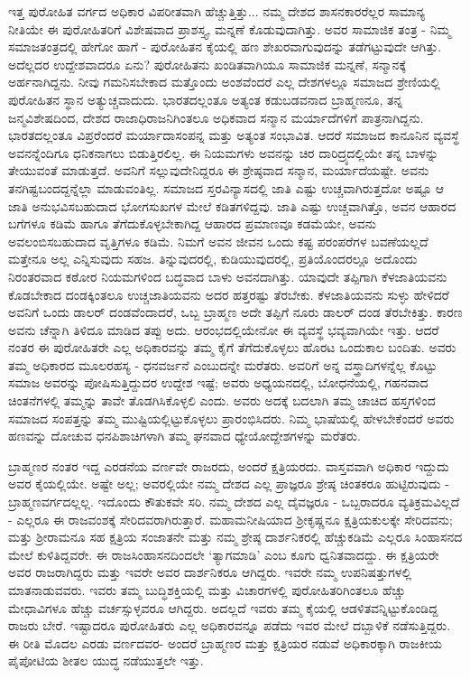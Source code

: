 ಇತ್ತ ಪುರೋಹಿತ ವರ್ಗದ ಅಧಿಕಾರ ವಿಪರೀತವಾಗಿ ಹೆಚ್ಚುತ್ತಿತ್ತು... ನಮ್ಮ ದೇಶದ ಶಾಸನಕಾರರೆಲ್ಲರ ಸಾಮಾನ್ಯ ನೀತಿಯೇ ಈ ಪುರೋಹಿತರಿಗೆ ವಿಶೇಷವಾದ ಪ್ರಾಶಸ್ತ್ಯ, ಮನ್ನಣೆ ಕೊಡುವುದಾಗಿತ್ತು. ಅವರ ಸಾಮಾಜಿಕ ತಂತ್ರ - ನಿಮ್ಮ ಸಮಾಜತಂತ್ರದಲ್ಲಿ ಹೇಗೋ ಹಾಗೆ - ಪುರೋಹಿತನ ಕೈಯಲ್ಲಿ ಹಣ ಶೇಖರವಾಗುವುದನ್ನು ತಡೆಗಟ್ಟುವುದೇ ಆಗಿತ್ತು. ಅದೆಲ್ಲದರ ಉದ್ದೇಶವಾದರೂ ಏನು? ಪುರೋಹಿತನು ಖಂಡಿತವಾಗಿಯೂ ಸಾಮಾಜಿಕ ಮನ್ನಣೆ, ಸನ್ಮಾನಕ್ಕೆ ಅರ್ಹನಾಗಿದ್ದನು. ನೀವು ಗಮನಿಸಬೇಕಾದ ಮತ್ತೊಂದು ಅಂಶವೆಂದರೆ ಎಲ್ಲ ದೇಶಗಳಲ್ಲೂ ಸಮಾಜದ ಶ್ರೇಣಿಯಲ್ಲಿ ಪುರೋಹಿತನ ಸ್ಥಾನ ಅತ್ಯುಚ್ಚವಾದುದು. ಭಾರತದಲ್ಲಂತೂ ಅತ್ಯಂತ ಕಡುಬಡವನಾದ ಬ್ರಾಹ್ಮಣನೂ, ತನ್ನ ಜನ್ಮವಿಶೇಷದಿಂದ, ದೇಶದ ರಾಜಾಧಿರಾಜನಿಗಿಂತಲೂ ಅಧಿಕವಾದ ಸನ್ಮಾನ ಮರ್ಯಾದೆಗಳಿಗೆ ಪಾತ್ರನಾಗಿದ್ದನು. ಭಾರತದಲ್ಲಂತೂ ವಿಪ್ರರೆಂದರೆ ಮರ್ಯಾದಾಸಂಪನ್ನ ಮತ್ತು ಅತ್ಯಂತ ಸಂಭಾವಿತ. ಆದರೆ ಸಮಾಜದ ಕಾನೂನಿನ ವ್ಯವಸ್ಥೆ ಅವನನ್ನೆಂದಿಗೂ ಧನಿಕನಾಗಲು ಬಿಡುತ್ತಿರಲಿಲ್ಲ. ಈ ನಿಯಮಗಳು ಅವನನ್ನು ಚಿರ ದಾರಿದ್ರ್ಯದಲ್ಲಿಯೇ ತನ್ನ ಬಾಳನ್ನು ತೇಯುವಂತೆ ಮಾಡುತ್ತದೆ. ಅವನಿಗೆ ಸಲ್ಲುವುದೇನಿದ್ದರೂ ಈ ಶ್ರೇಷ್ಠವಾದ ಸನ್ಮಾನ, ಮರ್ಯಾದೆಯಷ್ಟೇ. ಅವನು ತನಗಿಷ್ಟಬಂದದ್ದನ್ನೆಲ್ಲಾ ಮಾಡುವಂತಿಲ್ಲ. ಸಮಾಜದ ಸ್ತರವಿನ್ಯಾಸದಲ್ಲಿ ಜಾತಿ ಎಷ್ಟು ಉಚ್ಚವಾಗಿರುತ್ತದೋ ಅಷ್ಟೂ ಆ ಜಾತಿ ಅನುಭವಿಸಬಹುದಾದ ಭೋಗಸುಖಗಳ ಮೇಲೆ ಕಡಿತಗಳಿದ್ದವು. ಜಾತಿ ಎಷ್ಟು ಉಚ್ಚವಾಗಿತ್ತೊ, ಅವನ ಆಹಾರದ ಬಗೆಗಳೂ ಕಡಿಮೆ ಹಾಗೂ ತೆಗೆದುಕೊಳ್ಳಬೇಕಾಗಿದ್ದ ಆಹಾರದ ಪ್ರಮಾಣವೂ ಕಡಮೆಯೇ, ಅವನು ಅವಲಂಬಿಸಬಹುದಾದ ವೃತ್ತಿಗಳೂ ಕಡಿಮೆ. ನಿಮಗೆ ಅವನ ಜೀವನ ಒಂದು ಕಷ್ಟ ಪರಂಪರೆಗಳ ಬವಣೆಯಲ್ಲದೆ ಮತ್ತೇನೂ ಅಲ್ಲ ಎನ್ನಿಸುವುದು ಸಹಜ. ತಿನ್ನುವುದರಲ್ಲಿ, ಕುಡಿಯುವುದರಲ್ಲಿ, ಪ್ರತಿಯೊಂದರಲ್ಲೂ ಅದೊಂದು ನಿರಂತರವಾದ ಕಠೋರ ನಿಯಮಗಳಿಂದ ಬದ್ಧವಾದ ಬಾಳು ಅವನದಾಗಿತ್ತು. ಯಾವುದೇ ತಪ್ಪಿಗಾಗಿ ಕೆಳಜಾತಿಯವನು ಕೊಡಬೇಕಾದ ದಂಡಕ್ಕಿಂತಲೂ ಉಚ್ಚಜಾತಿಯವನು ಅದರ ಹತ್ತರಷ್ಟು ತೆರಬೇಕು. ಕೆಳಜಾತಿಯವನು ಸುಳ್ಳು ಹೇಳಿದರೆ ಅವನಿಗೆ ಒಂದು ಡಾಲರ್ ದಂಡವೆಂದಾದರೆ, ಒಬ್ಬ ಬ್ರಾಹ್ಮಣ ಅದೇ ತಪ್ಪಿಗೆ ನೂರು ಡಾಲರ್ ದಂಡ ತೆರಬೇಕಿತ್ತು. ಕಾರಣ ಅವನು ಚೆನ್ನಾಗಿ ತಿಳಿದೂ ಮಾಡಿದ ತಪ್ಪು ಅದು. ಆರಂಭದಲ್ಲಿಯೇನೋ ಈ ವ್ಯವಸ್ಥೆ ಭವ್ಯವಾಗಿಯೇ ಇತ್ತು. ಆದರೆ ನಂತರ ಈ ಪುರೋಹಿತರೇ ಎಲ್ಲ ಅಧಿಕಾರವನ್ನು ತಮ್ಮ ಕೈಗೆ ತೆಗೆದುಕೊಳ್ಳಲು ಹೊರಟ ಒಂದುಕಾಲ ಬಂದಿತು. ಅವರು ತಮ್ಮ ಅಧಿಕಾರದ ಮೂಲರಹಸ್ಯ - ಧನವರ್ಜನೆ ಎಂಬುದನ್ನೇ ಮರೆತರು. ಅವರಿಗೆ ಅನ್ನ ವಸ್ತ್ರಾದಿಗಳನ್ನೆಲ್ಲ ಕೊಟ್ಟು ಸಮಾಜ ಅವರನ್ನು ಪೋಷಿಸುತ್ತಿದ್ದುದರ ಉದ್ದೇಶ ಇಷ್ಟೆ; ಅವರು ಅಧ್ಯಯನದಲ್ಲಿ, ಬೋಧನೆಯಲ್ಲಿ, ಗಹನವಾದ ಚಿಂತನೆಗಳಲ್ಲಿ ತಮ್ಮನ್ನು ತಾವೇ ತೊಡಗಿಸಿಕೊಳ್ಳಲಿ ಎಂದು. ಅವರು ಅದಕ್ಕೆ ಬದಲಾಗಿ ತಮ್ಮ ಚಾಚಿದ ಹಸ್ತಗಳಿಂದ ಸಮಾಜದ ಸಂಪತ್ತನ್ನು ತಮ್ಮ ಮುಷ್ಟಿಯಲ್ಲಿಟ್ಟುಕೊಳ್ಳಲು ಪ್ರಾರಂಭಿಸಿದರು. ನಿಮ್ಮ ಭಾಷೆಯಲ್ಲಿ ಹೇಳಬೇಕೆಂದರೆ ಅವರು ಹಣವನ್ನು ದೋಚುವ ಧನಪಿಶಾಚಿಗಳಾಗಿ ತಮ್ಮ ಘನವಾದ ಧ್ಯೇಯೋದ್ದೇಶಗಳನ್ನು ಮರೆತರು.

ಬ್ರಾಹ್ಮಣರ ನಂತರ ಇದ್ದ ಎರಡನೆಯ ವರ್ಣವೇ ರಾಜರದು, ಅಂದರೆ ಕ್ಷತ್ರಿಯರದು. ವಾಸ್ತವವಾಗಿ ಅಧಿಕಾರ ಇದ್ದುದು ಅವರ ಕೈಯಲ್ಲಿಯೇ. ಅಷ್ಟೇ ಅಲ್ಲ; ಅವರಲ್ಲಿಯೇ ನಮ್ಮ ದೇಶದ ಎಲ್ಲ ಪ್ರಾಜ್ಞರೂ ಶ್ರೇಷ್ಠ ಚಿಂತಕರೂ ಹುಟ್ಟಿರುವುದು - ಬ್ರಾಹ್ಮಣವರ್ಗದಲ್ಲಲ್ಲ. ಇದೊಂದು ಕೌತುಕವೇ ಸರಿ. ನಮ್ಮ ದೇಶದ ಎಲ್ಲ ದೈವಜ್ಞರೂ - ಒಬ್ಬರಾದರೂ ವ್ಯತಿಕ್ರಮವಿಲ್ಲದೆ - ಎಲ್ಲರೂ ಈ ರಾಜವಂಶಕ್ಕೆ ಸೇರಿದವರಾಗಿರುತ್ತಾರೆ. ಮಹಾಮನೀಷಿಯಾದ ಶ‍್ರೀಕೃಷ್ಣನೂ ಕ್ಷತ್ರಿಯಕುಲಕ್ಕೇ ಸೇರಿದವನು; ಮತ್ತು ಶ‍್ರೀರಾಮನೂ ಸಹ ಕ್ಷತ್ರಿಯ ಸಂಜಾತನೇ ಮತ್ತು ನಮ್ಮ ಶ್ರೇಷ್ಠ ದಾರ್ಶನಿಕರಲ್ಲಿ ಹೆಚ್ಚುಕಡಿಮೆ ಎಲ್ಲರೂ ಸಿಂಹಾಸನದ ಮೇಲೆ ಕುಳಿತಿದ್ದವರೇ. ಈ ರಾಜಸಿಂಹಾಸನದಿಂದಲೇ ‘ತ್ಯಾಗಮಾಡಿ’ ಎಂಬ ಕೂಗು ಧ್ವನಿತವಾದದ್ದು. ಈ ಕ್ಷತ್ರಿಯರೇ ಅವರ ರಾಜರಾಗಿದ್ದರು ಮತ್ತು ಇವರೇ ಅವರ ದಾರ್ಶನಿಕರೂ ಆಗಿದ್ದರು. ಇವರೇ ನಮ್ಮ ಉಪನಿಷತ್ತುಗಳಲ್ಲಿ ಮಾತನಾಡುವವರು. ಇವರು ತಮ್ಮ ಬುದ್ಧಿಶಕ್ತಿಯಲ್ಲಿ ಮತ್ತು ವಿಚಾರಗಳಲ್ಲಿ ಪುರೋಹಿತರಿಗಿಂತಲೂ ಹೆಚ್ಚು ಮೇಧಾವಿಗಳೂ ಹೆಚ್ಚು ವರ್ಚಸ್ಸುಳ್ಳವರೂ ಆಗಿದ್ದರು. ಅದಲ್ಲದೆ ಇವರು ತಮ್ಮ ಕೈಯಲ್ಲಿ ಆಡಳಿತವನ್ನಿಟ್ಟುಕೊಂಡಿದ್ದ ರಾಜರು ಬೇರೆ. ಇಷ್ಟಾದರೂ ಪುರೋಹಿತರು ಎಲ್ಲ ಅಧಿಕಾರವನ್ನೂ ಪಡೆದು ಇವರ ಮೇಲೆ ದಬ್ಬಾಳಿಕೆ ನಡೆಸುತ್ತಿದ್ದರು. ಈ ರೀತಿ ಮೊದಲ ಎರಡು ವರ್ಣದವರ- ಅಂದರೆ ಬ್ರಾಹ್ಮಣರ ಮತ್ತು ಕ್ಷತ್ರಿಯರ ನಡುವೆ ಅಧಿಕಾರಕ್ಕಾಗಿ ರಾಜಕೀಯ ಪೈಪೋಟಿಯ ಶೀತಲ ಯುದ್ಧ ನಡೆಯುತ್ತಲೇ ಇತ್ತು.

